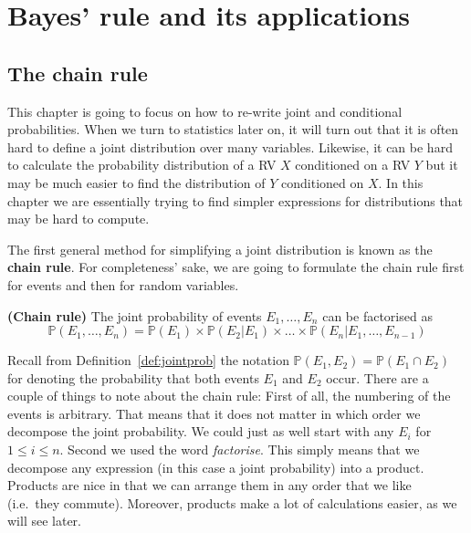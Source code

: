 
\setcounter{chapter}{3}
\chapter{Bayes' rule and its applications}

\section{The chain rule}

This chapter is going to focus on how to re-write joint and conditional probabilities. When we turn to statistics later on, it will
turn out that it is often hard to define a joint distribution over many variables. Likewise, it can be hard to calculate 
the probability distribution of a RV $ X $ conditioned on a RV $ Y $ but it may be much easier to find the distribution of $ Y $
conditioned on $ X $. In this chapter we are essentially trying to find simpler expressions for distributions that may be hard to
compute.

The first general method for simplifying a joint distribution is known as the \textbf{chain rule}.  For completeness' sake, we are going to formulate the chain rule first for events and then for random variables.

\begin{Theorem}{\textbf{(Chain rule)}} \label{thm:chain}
The joint probability of events $ E_{1}, \ldots, E_{n} $ can be factorised as
$$ \mathbb{P}(E_{1}, \ldots, E_{n}) = \mathbb{P}(E_{1}) \times \mathbb{P}(E_{2}|E_{1}) \times \ldots \times \mathbb{P}(E_{n}|E_{1}, \ldots, E_{n-1}) $$
\end{Theorem} 
Recall from Definition~\ref{def:jointprob} the notation $\mathbb{P}(E_1,E_2) = \mathbb{P}(E_1 \cap E_2)$ for denoting the probability that both events $E_1$ and $E_2$ occur. There are a couple of things to note about the chain rule: First of all, the numbering of the events is arbitrary. That means that it does not matter in which
order we decompose the joint probability. We could just as well start with any $ E_{i} $ for $ 1 \leq i \leq n $. Second we used the 
word \textit{factorise}. This simply means that we decompose any expression (in this case a joint probability) into a product. Products are
nice in that we can arrange them in any order that we like (i.e.\ they commute). Moreover, products make a lot of calculations easier, as we will
see later.

